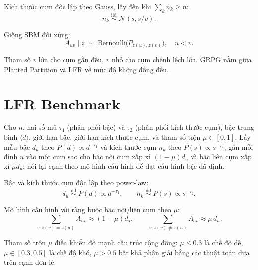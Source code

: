 \begin{description}[topsep=4pt, itemsep=2pt, leftmargin=2.4cm, style=nextline]
    \item[$\mathcal{D}_V$] Kích thước cụm độc lập theo Gauss, lấy đến khi $\sum_k n_k \geq n$:
    \[
        n_k \;\stackrel{\text{iid}}{\sim}\; \mathcal{N}(s, s/v).
    \]
    \item[$\mathcal{D}_E$] Giống SBM đối xứng:
    \[
        A_{uv} \mid z \;\sim\; \mathrm{Bernoulli}\bigl(P_{z(u), z(v)}\bigr), \quad u < v.
    \]
\end{description}

Tham số $v$ lớn cho cụm gần đều, $v$ nhỏ cho cụm chênh lệch lớn. GRPG nằm giữa Planted Partition và LFR về mức độ không đồng đều.

\section{LFR Benchmark}
\label{appsec:lfr}

\begin{definition}
\label{def:lfr}
Cho $n$, hai số mũ $\tau_1$ (phân phối bậc) và $\tau_2$ (phân phối kích thước cụm), bậc trung bình $\langle d \rangle$, giới hạn bậc, giới hạn kích thước cụm, và tham số trộn $\mu \in [0, 1]$. Lấy mẫu bậc $d_u$ theo $P(d) \propto d^{-\tau_1}$ và kích thước cụm $n_k$ theo $P(s) \propto s^{-\tau_2}$; gán mỗi đỉnh $u$ vào một cụm sao cho bậc nội cụm xấp xỉ $(1 - \mu) d_u$ và bậc liên cụm xấp xỉ $\mu d_u$; nối lại cạnh theo mô hình cấu hình để đạt cấu hình bậc đã định.
\end{definition}

\begin{description}[topsep=4pt, itemsep=2pt, leftmargin=2.4cm, style=nextline]
    \item[$\mathcal{D}_V$] Bậc và kích thước cụm độc lập theo power-law:
    \[
        d_u \;\stackrel{\text{iid}}{\sim}\; P(d) \propto d^{-\tau_1}, \qquad n_k \;\stackrel{\text{iid}}{\sim}\; P(s) \propto s^{-\tau_2}.
    \]
    \item[$\mathcal{D}_E$] Mô hình cấu hình với ràng buộc bậc nội/liên cụm theo $\mu$:
    \[
        \textstyle\sum_{v: z(v) = z(u)} A_{uv} \approx (1 - \mu) d_u, \qquad
        \textstyle\sum_{v: z(v) \neq z(u)} A_{uv} \approx \mu \, d_u.
    \]
\end{description}

Tham số trộn $\mu$ điều khiển độ mạnh cấu trúc cộng đồng: $\mu \leq 0.3$ là chế độ dễ, $\mu \in [0.3, 0.5]$ là chế độ khó, $\mu > 0.5$ bất khả phân giải bằng các thuật toán dựa trên cạnh đơn lẻ.

